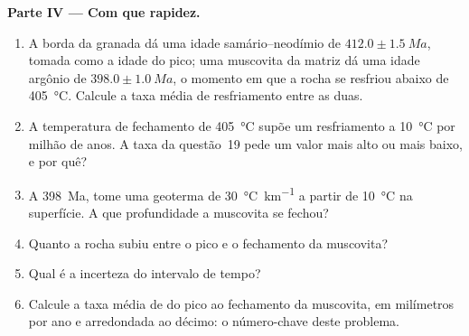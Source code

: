 \begin{problem}
\noindent\textbf{Parte IV --- Com que rapidez.}
\begin{enumerate}[resume]
\item A borda da granada dá uma idade samário--neodímio de $412.0 \pm \qty{1.5}{Ma}$, tomada
como a idade do pico; uma muscovita da matriz dá uma idade argônio de $398.0 \pm
\qty{1.0}{Ma}$, o momento em que a rocha se resfriou abaixo de \qty{405}{\celsius}. Calcule
a taxa média de resfriamento entre as duas.
\item A temperatura de fechamento de \qty{405}{\celsius} supõe um resfriamento a
\qty{10}{\celsius} por milhão de anos. A taxa da questão~19 pede um valor mais alto ou
mais baixo, e por quê?
\item A \qty{398}{Ma}, tome uma geoterma de \qty{30}{\celsius\per\km} a partir de
\qty{10}{\celsius} na superfície. A que profundidade a muscovita se fechou?
\item Quanto a rocha subiu entre o pico e o fechamento da muscovita?
\item Qual é a incerteza do intervalo de tempo?
\item Calcule a taxa média de  do pico ao fechamento da muscovita, em
milímetros por ano e arredondada ao décimo: o número-chave deste problema.
\end{enumerate}
\end{problem}
